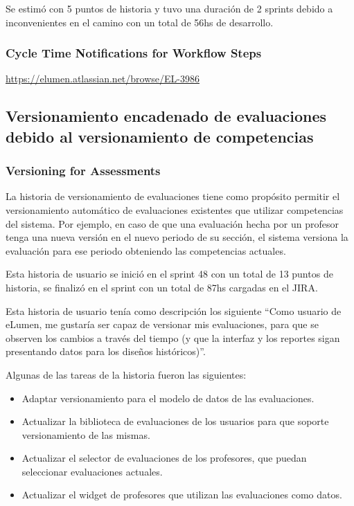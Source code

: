 Se estimó con 5 puntos de historia y tuvo una duración de 2 sprints debido a inconvenientes en el camino con un total de 56hs de desarrollo.

\subsubsection{Cycle Time Notifications for Workflow Steps}
\url{https://elumen.atlassian.net/browse/EL-3986}

\subsection{Versionamiento encadenado de evaluaciones debido al versionamiento de competencias}
\subsubsection{Versioning for Assessments}
La historia de versionamiento de evaluaciones tiene como propósito permitir el versionamiento automático de evaluaciones existentes que utilizar competencias del sistema. Por ejemplo, en caso de que una evaluación hecha por un profesor tenga una nueva versión en el nuevo periodo de su sección, el sistema versiona la evaluación para ese periodo obteniendo las competencias actuales.

Esta historia de usuario se inició en el sprint 48 con un total de 13 puntos de historia, se finalizó en el sprint con un total de 87hs cargadas en el JIRA.

Esta historia de usuario tenía como descripción los siguiente “Como usuario de eLumen, me gustaría ser capaz de versionar mis evaluaciones, para que se observen los cambios a través del tiempo (y que la interfaz y los reportes sigan presentando datos para los diseños históricos)”.

Algunas de las tareas de la historia fueron las siguientes:
\begin{itemize}
	\item Adaptar versionamiento para el modelo de datos de las evaluaciones.
	\item Actualizar la biblioteca de evaluaciones de los usuarios para que soporte versionamiento de las mismas.
	\item Actualizar el selector de evaluaciones de los profesores, que puedan seleccionar evaluaciones actuales.
	\item Actualizar el widget de profesores que utilizan las evaluaciones como datos.
\end{itemize}

